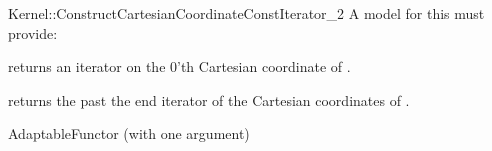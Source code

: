 \begin{ccRefFunctionObjectConcept}{Kernel::ConstructCartesianCoordinateConstIterator_2}
A model for this must provide:



 {returns an iterator on the 0'th Cartesian coordinate of .}

 {returns the past the end iterator of the Cartesian coordinates of .}




\ccRefines
AdaptableFunctor (with one argument)



\end{ccRefFunctionObjectConcept}

